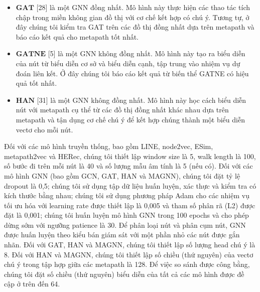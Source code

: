 \begin{itemize}
  \item $\mathbf{GAT}$ [28] là một GNN đồng nhất. Mô hình này thực hiện các thao tác tích chập trong miền không gian đồ thị với cơ chế kết hợp có chú ý. Tương tự, ở đây chúng tôi kiểm tra GAT trên các đồ thị đồng nhất dựa trên metapath và báo cáo kết quả cho metapath tốt nhất.
  \item $\mathbf{GATNE}$ [5] là một GNN không đồng nhất. Mô hình này tạo ra biểu diễn của nút từ biểu diễn cơ sở và biểu diễn cạnh, tập trung vào nhiệm vụ dự đoán liên kết. Ở đây chúng tôi báo cáo kết quả từ biến thể GATNE có hiệu quả tốt nhất.
  \item $\mathbf{HAN}$ [31] là một GNN không đồng nhất. Mô hình này học cách biểu diễn nút với metapath cụ thể từ các đồ thị đồng nhất khác nhau dựa trên metapath và tận dụng cơ chế chú ý để kết hợp chúng thành một biểu diễn vectơ cho mỗi nút.
\end{itemize}

Đối với các mô hình truyền thống, bao gồm LINE, node2vec, ESim, metapath2vec và HERec, chúng tôi thiết lập window size là 5, walk length là 100, số bước đi trên mỗi nút là 40 và số lượng mẫu âm tính là 5 (nếu có). Đối với các mô hình GNN (bao gồm GCN, GAT, HAN và MAGNN), chúng tôi đặt tỷ lệ dropout là 0,5; chúng tôi sử dụng tập dữ liệu huấn luyện, xác thực và kiểm tra có kích thước bằng nhau; chúng tôi sử dụng phương pháp Adam cho các nhiệm vụ tối ưu hóa với learning rate được thiết lập là 0,005 và tham số phân rã (L2) được đặt là 0,001; chúng tôi huấn luyện mô hình GNN trong 100 epochs và cho phép dừng sớm với ngưỡng patience là 30. Để phân loại nút và phân cụm nút, GNN được huấn luyện theo kiểu bán giám sát với một phần nhỏ các nút được gắn nhãn. Đối với GAT, HAN và MAGNN, chúng tôi thiết lập số lượng head chú ý là 8. Đối với HAN và MAGNN, chúng tôi thiết lập số chiều (thứ nguyên) của vectơ chú ý trong tập hợp giữa các metapath là 128. Để việc so sánh được công bằng, chúng tôi đặt số chiều (thứ nguyên) biểu diễn của tất cả các mô hình được đề cập ở trên đến 64.

